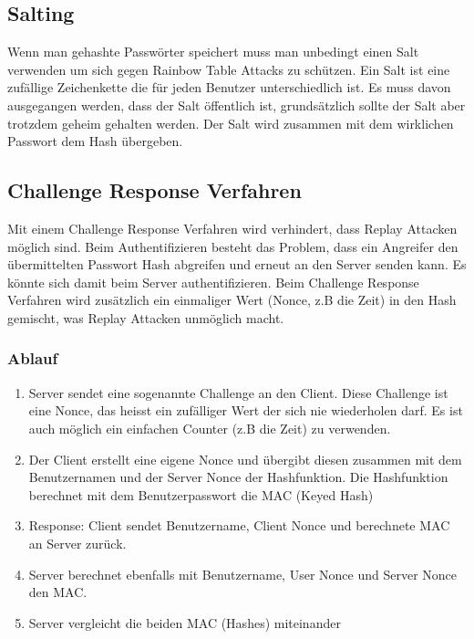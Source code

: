 \subsection{Salting}
Wenn man gehashte Passwörter speichert muss man unbedingt einen Salt verwenden um sich gegen Rainbow Table Attacks zu schützen. Ein Salt ist eine zufällige Zeichenkette die für jeden Benutzer unterschiedlich ist. Es muss davon ausgegangen werden, dass der Salt öffentlich ist, grundsätzlich sollte der Salt aber trotzdem geheim gehalten werden. Der Salt wird zusammen mit dem wirklichen Passwort dem Hash übergeben.


\subsection{Challenge Response Verfahren}
Mit einem Challenge Response Verfahren wird verhindert, dass Replay Attacken möglich sind. Beim Authentifizieren besteht das Problem, dass ein Angreifer den übermittelten Passwort Hash abgreifen und erneut an den Server senden kann. Es könnte sich damit beim Server authentifizieren. Beim Challenge Response Verfahren wird zusätzlich ein einmaliger Wert (Nonce, z.B die Zeit) in den Hash gemischt, was Replay Attacken unmöglich macht. 
\subsubsection{Ablauf}
\begin{enumerate}
	\item Server sendet eine sogenannte Challenge an den Client. Diese Challenge ist eine Nonce, das heisst ein zufälliger Wert der sich nie wiederholen darf. Es ist auch möglich ein einfachen Counter (z.B die Zeit) zu verwenden.
	\item Der Client erstellt eine eigene Nonce und übergibt diesen zusammen mit dem Benutzernamen und der Server Nonce der Hashfunktion. Die Hashfunktion berechnet mit dem Benutzerpasswort die MAC (Keyed Hash)
	\item Response: Client sendet Benutzername, Client Nonce und berechnete MAC an Server zurück.
	\item Server berechnet ebenfalls mit Benutzername, User Nonce und Server Nonce den MAC.
	\item Server vergleicht die beiden MAC (Hashes) miteinander
\end{enumerate}

